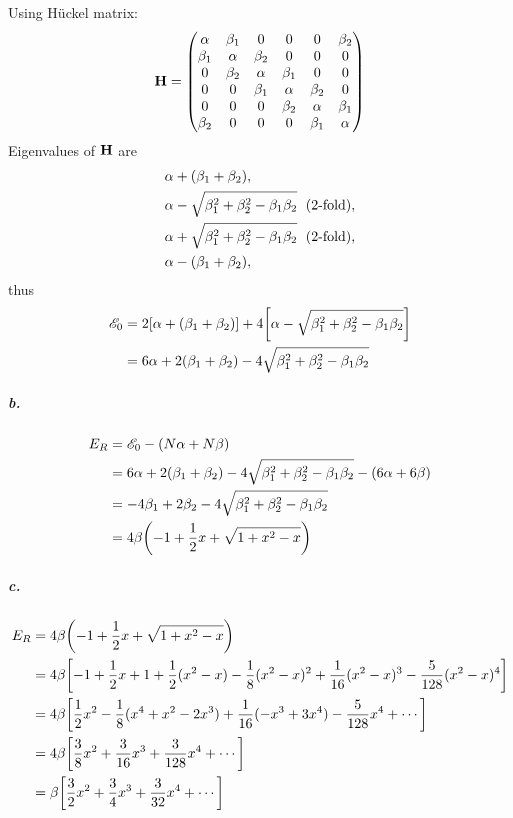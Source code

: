 \documentclass[a4paper]{article}
\newcommand{\subex}[1]{\subparagraph{#1}}
\numberwithin{equation}{subsection}
\begin{document}
Using H\"uckel matrix:
\begin{align}
\vb{H} = \mqty( 
\alpha  & \beta_1 & 0       & 0       & 0       & \beta_2\\
\beta_1 & \alpha  & \beta_2 & 0       & 0       & 0      \\
0       & \beta_2 & \alpha  & \beta_1 & 0       & 0      \\
0       & 0       & \beta_1 & \alpha  & \beta_2 & 0      \\
0       & 0       & 0       & \beta_2 & \alpha  & \beta_1\\
\beta_2 & 0       & 0       & 0       & \beta_1 & \alpha  
)
\end{align}
Eigenvalues of $ \vb{H} $ are
\begin{align}\label{key}
&\alpha + (\beta_1 + \beta_2), \notag\\
&\alpha - \sqrt{\beta_1^2 + \beta_2^2 - \beta_1\beta_2} \;\text{ (2-fold)}, \notag\\
&\alpha + \sqrt{\beta_1^2 + \beta_2^2 - \beta_1\beta_2} \;\text{ (2-fold)}, \notag\\
&\alpha - (\beta_1 + \beta_2),
\end{align}
thus
\begin{align}
\mathscr{E}_0 &= 2\qty[\alpha + (\beta_1 + \beta_2)] + 4\qty[\alpha - \sqrt{\beta_1^2 + \beta_2^2 - \beta_1\beta_2}] \notag\\
&= 6\alpha + 2(\beta_1 + \beta_2) - 4\sqrt{\beta_1^2 + \beta_2^2 - \beta_1\beta_2}
\end{align}

\subex{b.}
\begin{align}
E_R &= \mathscr{E}_0 - (N\alpha + N\beta) \notag\\
&= 6\alpha + 2(\beta_1 + \beta_2) - 4\sqrt{\beta_1^2 + \beta_2^2 - \beta_1\beta_2} - (6\alpha + 6\beta) \notag\\
&= -4\beta_1 + 2\beta_2 - 4\sqrt{\beta_1^2 + \beta_2^2 - \beta_1\beta_2} \notag\\
&= 4\beta\qty(-1 + \dfrac{1}{2}x + \sqrt{1 + x^2 - x})
\end{align}

\subex{c.}
\begin{align}
E_R &= 4\beta\qty(-1 + \dfrac{1}{2}x + \sqrt{1 + x^2 - x}) \notag\\
&= 4\beta\qty[ -1 + \dfrac{1}{2}x 
+ 1 + \dfrac{1}{2}(x^2-x) - \dfrac{1}{8}(x^2-x)^2 + \dfrac{1}{16}(x^2-x)^3 - \dfrac{5}{128}(x^2-x)^4 ] \notag\\
&= 4\beta\qty[ 
\dfrac{1}{2}x^2 - \dfrac{1}{8}(x^4 + x^2 - 2x^3) 
+ \dfrac{1}{16}(-x^3 + 3x^4) - \dfrac{5}{128}x^4 + \cdots ] \notag\\
&= 4\beta\qty[ 
\dfrac{3}{8}x^2 + \dfrac{3}{16}x^3 + \dfrac{3}{128}x^4 + \cdots ] \notag\\
&= \beta\qty[ 
\dfrac{3}{2}x^2 + \dfrac{3}{4}x^3 + \dfrac{3}{32}x^4 + \cdots ]
\end{align}
\end{document}
